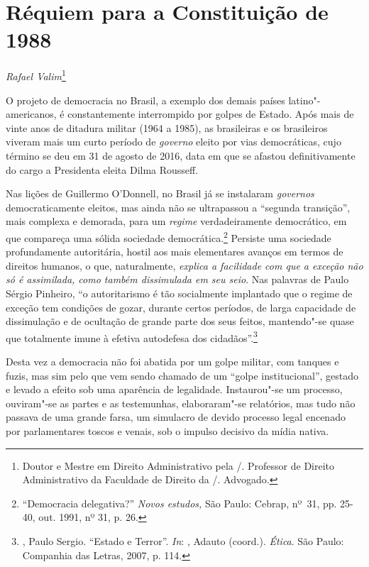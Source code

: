 \chapter*{Réquiem para a Constituição de 1988}


\begin{flushright}
\emph{Rafael Valim}\footnote{Doutor e Mestre em Direito Administrativo
pela /. Professor de Direito Administrativo da Faculdade de Direito
da /. Advogado.}
\end{flushright}

O projeto de democracia no Brasil, a exemplo dos demais países
latino"-americanos, é constantemente interrompido por golpes de Estado.
Após mais de vinte anos de ditadura militar (1964 a 1985), as
brasileiras e os brasileiros viveram mais um curto período de
\emph{governo} eleito por vias democráticas, cujo término se deu em 31
de agosto de 2016, data em que se afastou definitivamente do cargo a
Presidenta eleita Dilma Rousseff.

Nas lições de Guillermo O'Donnell, no Brasil já se instalaram
\emph{governos} democraticamente eleitos, mas ainda não se ultrapassou a
``segunda transição'', mais complexa e demorada, para um \emph{regime}
verdadeiramente democrático, em que compareça uma sólida sociedade
democrática.\footnote{``Democracia delegativa?'' \emph{Novos estudos,}
  São Paulo: Cebrap, nº~31, pp. 25-40, out. 1991, nº 31, p. 26.}
Persiste uma sociedade profundamente autoritária, hostil aos mais
elementares avanços em termos de direitos humanos, o que, naturalmente,
\emph{explica a facilidade com que a exceção não só é assimilada, como
também dissimulada em seu seio}. Nas palavras de Paulo Sérgio Pinheiro,
``o autoritarismo é tão socialmente implantado que o regime de exceção
tem condições de gozar, durante certos períodos, de larga capacidade de
dissimulação e de ocultação de grande parte dos seus feitos, mantendo"-se
quase que totalmente imune à efetiva autodefesa dos
cidadãos''.\footnote{, Paulo Sergio. ``Estado e Terror''.
  \emph{In}: , Adauto (coord.). \emph{Ética}. São Paulo: Companhia
  das Letras, 2007, p. 114.}

Desta vez a democracia não foi abatida por um golpe militar, com tanques
e fuzis, mas sim pelo que vem sendo chamado de um ``golpe
institucional'', gestado e levado a efeito sob uma aparência de
legalidade. Instaurou"-se um processo, ouviram"-se as partes e as
testemunhas, elaboraram"-se relatórios, mas tudo não passava de uma
grande farsa, um simulacro de devido processo legal encenado por
parlamentares toscos e venais, sob o impulso decisivo da mídia nativa.

